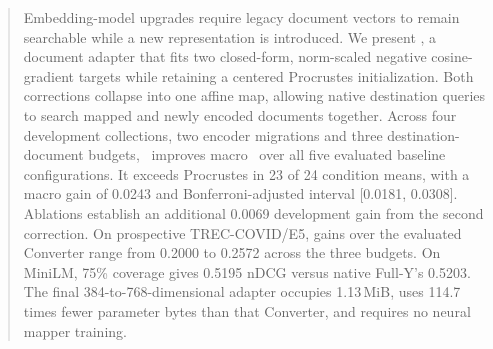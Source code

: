 \begin{abstract}
Embedding-model upgrades require legacy document vectors to remain searchable while a new representation is introduced. We present \method, a document adapter that fits two closed-form, norm-scaled negative cosine-gradient targets while retaining a centered Procrustes initialization. Both corrections collapse into one affine map, allowing native destination queries to search mapped and newly encoded documents together. Across four development collections, two encoder migrations and three destination-document budgets, \method\ improves macro \ndcg\ over all five evaluated baseline configurations. It exceeds Procrustes in 23 of 24 condition means, with a macro gain of 0.0243 and Bonferroni-adjusted interval [0.0181, 0.0308]. Ablations establish an additional 0.0069 development gain from the second correction. On prospective TREC-COVID/E5, gains over the evaluated Converter range from 0.2000 to 0.2572 across the three budgets. On MiniLM, 75\% coverage gives 0.5195 nDCG versus native Full-Y's 0.5203. The final 384-to-768-dimensional adapter occupies 1.13\,MiB, uses 114.7 times fewer parameter bytes than that Converter, and requires no neural mapper training.
\end{abstract}
